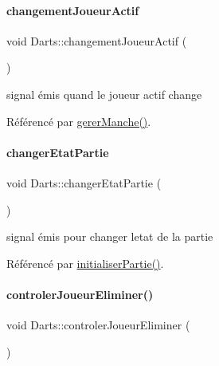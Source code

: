 \paragraph{\texorpdfstring{changement\+Joueur\+Actif}{changementJoueurActif}}
{\footnotesize\ttfamily void Darts\+::changement\+Joueur\+Actif (\begin{DoxyParamCaption}{ }\end{DoxyParamCaption})\hspace{0.3cm}{\ttfamily [signal]}}



signal émis quand le joueur actif change 



Référencé par \hyperlink{darts_8cpp_source_l00303}{gerer\+Manche()}.

\mbox{\label{class_darts_a25cf64530c84d7aa261a4806e88dcd6e}} 
\paragraph{\texorpdfstring{changer\+Etat\+Partie}{changerEtatPartie}}
{\footnotesize\ttfamily void Darts\+::changer\+Etat\+Partie (\begin{DoxyParamCaption}{ }\end{DoxyParamCaption})\hspace{0.3cm}{\ttfamily [signal]}}



signal émis pour changer l\textquotesingle{}etat de la partie 



Référencé par \hyperlink{darts_8cpp_source_l00144}{initialiser\+Partie()}.

\mbox{\label{class_darts_a4ddf889c9c3933e061b182aeb5680c20}} 
\paragraph{\texorpdfstring{controler\+Joueur\+Eliminer()}{controlerJoueurEliminer()}}
{\footnotesize\ttfamily void Darts\+::controler\+Joueur\+Eliminer (\begin{DoxyParamCaption}{ }\end{DoxyParamCaption})\hspace{0.3cm}{\ttfamily [private]}}



